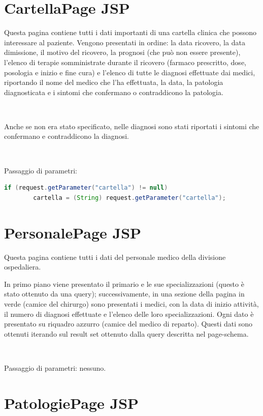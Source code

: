 \documentclass[a4paper,titlepage]{article}
\begin{document}
\section{CartellaPage JSP}

Questa pagina contiene tutti i dati importanti di una cartella clinica che possono interessare al paziente. Vengono presentati in ordine: la data ricovero, la data dimissione, il motivo del ricovero, la prognosi (che può non essere presente), l'elenco di terapie somministrate durante il ricovero (farmaco prescritto, dose, posologia e inizio e fine cura) e l'elenco di tutte le diagnosi effettuate dai medici, riportando il nome del medico che l'ha effettuata, la data, la patologia diagnosticata e i sintomi che confermano o contraddicono la patologia.

~

Anche se non era stato specificato, nelle diagnosi sono stati riportati i sintomi che confermano e contraddicono la diagnosi.

~

Passaggio di parametri: 

\begin{lstlisting}[language=java]
	if (request.getParameter("cartella") != null)
		cartella = (String) request.getParameter("cartella");

\end{lstlisting}

\section{PersonalePage JSP}

Questa pagina contiene tutti i dati del personale medico della divisione ospedaliera.

In primo piano viene presentato il primario e le sue specializzazioni (questo è stato ottenuto da una query); successivamente, in una sezione della pagina in verde (camice del chirurgo) sono presentati i medici, con la data di inizio attività, il numero di diagnosi effettuate e l'elenco delle loro specializzazioni. Ogni dato è presentato su riquadro azzurro (camice del medico di reparto). Questi dati sono ottenuti iterando sul result set ottenuto dalla query descritta nel page-schema.

~

Passaggio di parametri: nessuno.


\section{PatologiePage JSP}
\end{document}
